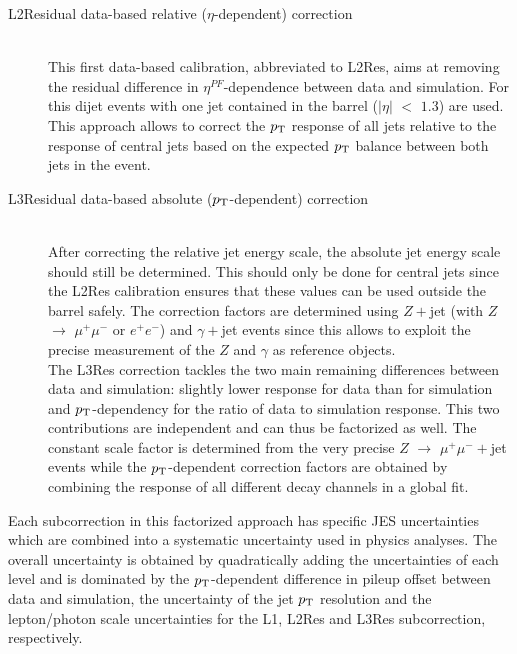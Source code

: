 \begin{myindentpar}
\begin{description}
    \item[L2Residual data-based relative ($\eta$-dependent) correction] \hfill \\
    This first data-based calibration, abbreviated to L2Res, aims at removing the residual difference in $\eta^{PF}$-dependence between data and simulation. For this dijet events with one jet contained in the barrel ($\vert \eta \vert$ $<$ $1.3$) are used. This approach allows to correct the $p_{\rm T}$ response of all jets relative to the response of central jets based on the expected $p_{\rm T}$ balance between both jets in the event.
        
    \item[L3Residual data-based absolute ($p_{\rm T}$-dependent) correction] \hfill \\
    After correcting the relative jet energy scale, the absolute jet energy scale should still be determined. This should only be done for central jets since the L2Res calibration ensures that these values can be used outside the barrel safely. 
    The correction factors are determined using $Z+$jet (with $Z$ $\rightarrow$ $\mu^{+}\mu^{-}$ or $e^{+}e^{-}$) and $\gamma+$jet events since this allows to exploit the precise measurement of the $Z$ and $\gamma$ as reference objects.
    \\
    The L3Res correction tackles the two main remaining differences between data and simulation: slightly lower response for data than for simulation and $p_{\rm T}$-dependency for the ratio of data to simulation response. This two contributions are independent and can thus be factorized as well. The constant scale factor is determined from the very precise $Z$ $\rightarrow$ $\mu^{+} \mu^{-}+$jet events while the $p_{\rm T}$-dependent correction factors are obtained by combining the response of all different decay channels in a global fit.
  \end{description}
\end{myindentpar}

Each subcorrection in this factorized approach has specific JES uncertainties which are combined into a systematic uncertainty used in physics analyses. The overall uncertainty is obtained by quadratically adding the uncertainties of each level and is dominated by the $p_{\rm T}$-dependent difference in pileup offset between data and simulation, the uncertainty of the jet $p_{\rm T}$ resolution and the lepton/photon scale uncertainties for the L1, L2Res and L3Res subcorrection, respectively.

